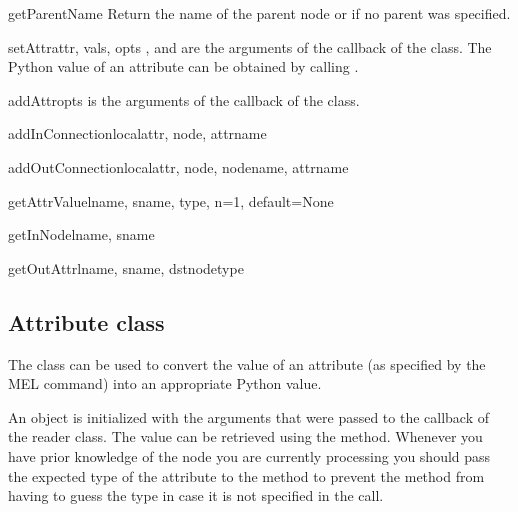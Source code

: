 \begin{methoddesc}{getParentName}{}
Return the name of the parent node or  if no parent was specified.
\end{methoddesc}

\begin{methoddesc}{setAttr}{attr, vals, opts}
,  and  are the arguments of the 
 callback of the  class. The Python
value of an attribute can be obtained by calling .
\end{methoddesc}

\begin{methoddesc}{addAttr}{opts}
 is the arguments of the  callback of 
the  class.
\end{methoddesc}

\begin{methoddesc}{addInConnection}{localattr, node, attrname}
\end{methoddesc}

\begin{methoddesc}{addOutConnection}{localattr, node, nodename, attrname}
\end{methoddesc}

\begin{methoddesc}{getAttrValue}{lname, sname, type, n=1, default=None}
\end{methoddesc}

\begin{methoddesc}{getInNode}{lname, sname}
\end{methoddesc}

\begin{methoddesc}{getOutAttr}{lname, sname, dstnodetype}
\end{methoddesc}

\subsection{Attribute class}

The  class can be used to convert the value of an
attribute (as specified by the  MEL command) into an
appropriate Python value.

An  object is initialized with the arguments that
were passed to the  callback of the reader
class. The value can be retrieved using the 
method. Whenever you have prior knowledge of the node you are 
currently processing you should pass the expected type of the
attribute to the  method to prevent the
method from having to guess the type in case it is not specified
in the  call.

